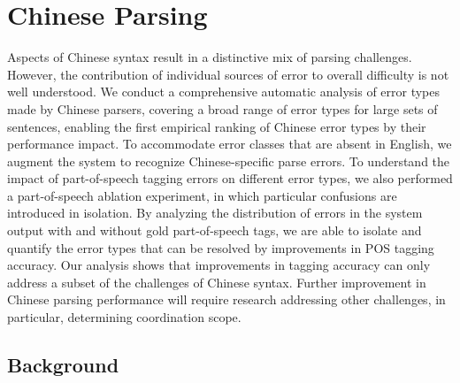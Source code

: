 
\section{Chinese Parsing}

Aspects of Chinese syntax result in a distinctive mix of parsing challenges.
However, the contribution of individual sources of error to overall difficulty is not well understood.  
We conduct a comprehensive automatic analysis of error types made by Chinese parsers, covering a broad range of error types for large sets of sentences, enabling the first empirical ranking of Chinese error types by their performance impact.  
To accommodate error classes that are absent in English, we augment the system to recognize Chinese-specific parse errors.
To understand the impact of part-of-speech tagging errors on different error types, we also performed a part-of-speech ablation experiment, in which particular confusions are introduced in isolation.
By analyzing the distribution of errors in the system output with and without gold part-of-speech tags, we are able to isolate and quantify the error types that can be resolved by improvements in POS tagging accuracy.
Our analysis shows that improvements in tagging accuracy can only address a subset of the challenges of Chinese syntax.
Further improvement in Chinese parsing performance will require research addressing other challenges, in particular, determining coordination scope.

\subsection{Background}

